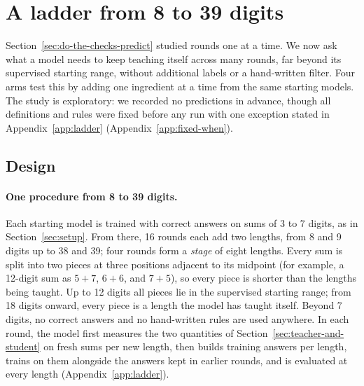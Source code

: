 \section{A ladder from 8 to 39 digits}
\label{sec:ladder}

Section~\ref{sec:do-the-checks-predict} studied rounds one at a time. We now
ask what a model needs to keep teaching itself across many rounds, far beyond
its supervised starting range, without additional labels or a hand-written
filter. Four arms test this by adding one ingredient at a time from the same
starting models. The study is exploratory: we recorded no predictions in
advance, though all definitions and rules were fixed before any run with one
exception stated in Appendix~\ref{app:ladder}
(Appendix~\ref{app:fixed-when}).

\subsection{Design}
\label{sec:ladder-design}

\paragraph{One procedure from 8 to 39 digits.}
Each starting model is trained with correct answers on sums of 3 to 7 digits,
as in Section~\ref{sec:setup}. From there, 16 rounds each add two lengths, from
8 and 9 digits up to 38 and 39; four rounds form a \emph{stage} of eight
lengths. Every sum is split into two pieces at three positions adjacent to its
midpoint (for example, a 12-digit sum as $5+7$, $6+6$, and $7+5$), so every
piece is shorter than the lengths being taught. Up to 12 digits all pieces lie
in the supervised starting range; from 18 digits onward, every piece is a
length the model has taught itself. Beyond 7 digits, no correct answers and no
hand-written rules are used anywhere. In each round, the model first measures
the two quantities of Section~\ref{sec:teacher-and-student} on
\gpLadCheckSums{} fresh sums per new length, then builds \gpLadQuota{} training
answers per length, trains on them alongside the answers kept in earlier
rounds, and is evaluated at every length (Appendix~\ref{app:ladder}).

